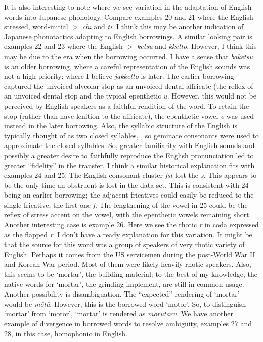 \documentclass[12pt]{article}
\begin{document}
It is also interesting to note where we see variation in the adaptation of English words into Japanese phonology. Compare examples 20 and 21 where the English stressed, word-initial  $>$ {\it ch\={\i}} and {\it t\={\i}}. I think this may be another indication of Japanese phonotactics adapting to English borrowings. A similar looking pair is examples 22 and 23 where the English  $>$ {\it ketsu} and {\it kketto}. However, I think this may be due to the era when the borrowing occurred. I have a sense that {\it baketsu} is an older borrowing, where a careful representation of the English sounds was not a high priority; where I believe {\it jakketto} is later. The earlier borrowing captured the unvoiced alveolar stop as an unvoiced dental affricate (the reflex of an unvoiced dental stop and the typical epenthetic {\it u}. However, this would not be perceived by English speakers as a faithful rendition of the word. To retain the stop (rather than have lenition to the affricate), the epenthetic vowel {\it o} was used instead in the later borrowing. Also, the syllabic structure of the English is typically thought of as two closed syllables, , so geminate consonants were used to approximate the closed syllables. So, greater familiarity with English sounds and possibly a greater desire to faithfully reproduce the English pronunciation led to greater ``fidelity'' in the transfer. I think a similar historical explanation fits with examples 24 and 25. The English consonant cluster {\it fst} lost the {\it s}. This appears to be the only time an obstruent is lost in the data set. This is consistent with 24 being an earlier borrowing; the adjacent fricatives could easily be reduced to the single fricative, the first one {\it f}. The lengthening of the vowel in 25 could be the reflex of stress accent on the vowel, with the epenthetic vowels remaining short. Another interesting case is example 26. Here we see the rhotic {\it r} in coda expressed as the flapped {\it r}. I don't have a ready explanation for this variation. It might be that the source for this word was a group of speakers of very rhotic variety of English. Perhaps it comes from the US servicemen during the post-World War II and Korean War period. Most of them were likely heavily rhotic speakers. Also, this seems to be `mortar', the building material; to the best of my knowledge, the native words for `mortar', the grinding implement, are still in common usage. Another possibility is disambiguation. The ``expected'' rendering of `mortar' would be {\it m\={o}t\={a}}. However, this is the borrowed word `motor'. So, to distinguish `mortar' from `motor', `mortar' is rendered as {\it morutaru}. We have another example of divergence in borrowed words to resolve ambiguity, examples 27 and 28, in this case, homophonic in English.
\end{document}
